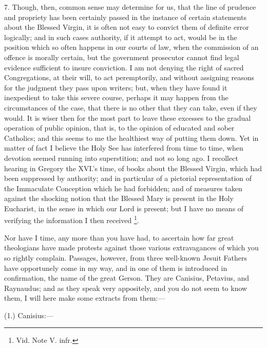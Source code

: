 7. Though, then, common sense may determine for us, that the line of
prudence and propriety has been certainly passed in the instance of
certain statements about the Blessed Virgin, it is often not easy to
convict them of definite error logically; and in such cases authority,
if it attempt to act, would be in the position which so often happens in
our courts of law, when the commission of an offence is morally certain,
but the government prosecutor cannot find legal evidence sufficient
to insure conviction. I am not denying the right of sacred
Congregations, at their will, to act peremptorily, and without assigning
reasons for the judgment they pass upon writers; but, when they have
found it inexpedient to take this severe course, perhaps it may happen
from the circumstances of the case, that there is no other that they can
take, even if they would. It is wiser then for the most part to leave
these excesses to the gradual operation of public opinion, that is, to
the opinion of educated and sober Catholics; and this seems to me the
healthiest way of putting them down. Yet in matter of fact I believe the
Holy See has interfered from time to time, when devotion seemed running
into superstition; and not so long ago. I recollect hearing in Gregory
the XVI.'s time, of books about the Blessed Virgin, which had been
suppressed by authority; and in particular of a pictorial representation
of the Immaculate Conception which he had forbidden; and of measures
taken against the shocking notion that the Blessed Mary is present in
the Holy Eucharist, in the sense in which our Lord is present; but I
have no means of verifying the information I then received \footnote{Vid. Note
V. infr.}.

Nor have I time, any more than you have had, to ascertain how far
great theologians have made protests against those various extravagances
of which you so rightly complain. Passages, however, from three
well-known Jesuit Fathers have opportunely come in my way, and in one of
them is introduced in confirmation, the name of the great Gerson. They
are Canisius, Petavius, and Raynaudus; and as they speak very appositely, and you do not seem to know them, I will here make some
extracts from them:—

(1.) Canisius:—

